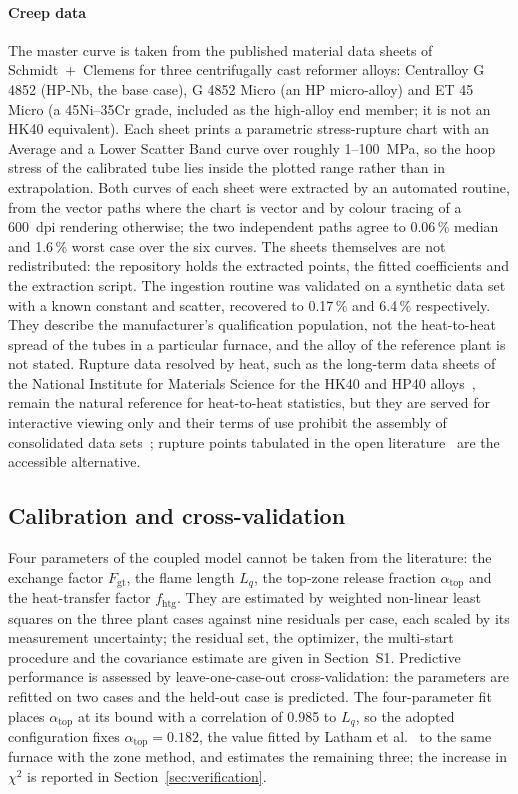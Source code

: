 \documentclass[final,3p,times]{elsarticle}
\begin{document}
\paragraph{Creep data} The master curve is taken from the published material data sheets of Schmidt~+~Clemens for three centrifugally cast reformer alloys: Centralloy G 4852 (HP-Nb, the base case), G 4852 Micro (an HP micro-alloy) and ET 45 Micro (a 45Ni--35Cr grade, included as the high-alloy end member; it is not an HK40 equivalent). Each sheet prints a parametric stress-rupture chart with an Average and a Lower Scatter Band curve over roughly 1--100~MPa, so the hoop stress of the calibrated tube lies inside the plotted range rather than in extrapolation. Both curves of each sheet were extracted by an automated routine, from the vector paths where the chart is vector and by colour tracing of a 600~dpi rendering otherwise; the two independent paths agree to 0.06\,\% median and 1.6\,\% worst case over the six curves. The sheets themselves are not redistributed: the repository holds the extracted points, the fitted coefficients and the extraction script. The ingestion routine was validated on a synthetic data set with a known constant and scatter, recovered to 0.17\,\% and 6.4\,\% respectively. They describe the manufacturer's qualification population, not the heat-to-heat spread of the tubes in a particular furnace, and the alloy of the reference plant is not stated. Rupture data resolved by heat, such as the long-term data sheets of the National Institute for Materials Science for the HK40 and HP40 alloys~\cite{nims16b,nims38a}, remain the natural reference for heat-to-heat statistics, but they are served for interactive viewing only and their terms of use prohibit the assembly of consolidated data sets~\cite{matnavi_terms}; rupture points tabulated in the open literature~\cite{whittaker2013,haidemenopoulos2021} are the accessible alternative.

\subsection{Calibration and cross-validation}
\label{sec:calibration}

Four parameters of the coupled model cannot be taken from the literature: the exchange factor $F_{\mathrm{gt}}$, the flame length $L_q$, the top-zone release fraction $\alpha_{\mathrm{top}}$ and the heat-transfer factor $f_{\mathrm{htg}}$. They are estimated by weighted non-linear least squares on the three plant cases against nine residuals per case, each scaled by its measurement uncertainty; the residual set, the optimizer, the multi-start procedure and the covariance estimate are given in Section~S1. Predictive performance is assessed by leave-one-case-out cross-validation: the parameters are refitted on two cases and the held-out case is predicted. The four-parameter fit places $\alpha_{\mathrm{top}}$ at its bound with a correlation of 0.985 to $L_q$, so the adopted configuration fixes $\alpha_{\mathrm{top}} = 0.182$, the value fitted by Latham et al.~\cite{latham2011} to the same furnace with the zone method, and estimates the remaining three; the increase in $\chi^2$ is reported in Section~\ref{sec:verification}.
\end{document}
